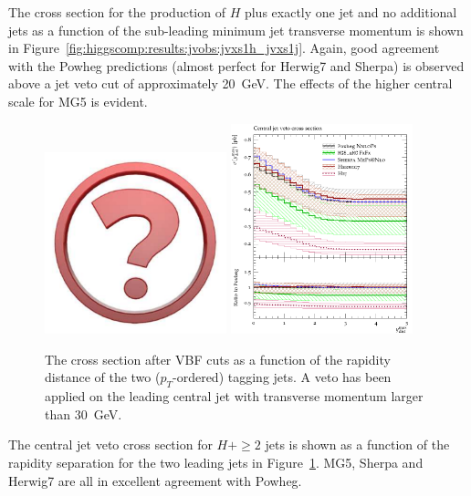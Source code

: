 The cross section for the production of $H$ plus exactly one jet and
no additional jets as a function of the sub-leading minimum jet
transverse momentum is shown in
Figure~\ref{fig:higgscomp:results:jvobs:jvxs1h_jvxs1j}. Again, good
agreement with the Powheg predictions (almost perfect for Herwig7 and
Sherpa) is observed above a jet veto cut of approximately 20~GeV. The
effects of the higher central scale for MG5 is evident.

\begin{figure}[t!]
  \centering
  \includegraphics[width=0.47\textwidth]{Micon.pdf}
  \hfill
  \includegraphics[width=0.47\textwidth]{figures/hjetscomp_xs_central_jet_veto_VBF.pdf}
  \caption{
    The cross section after VBF cuts as a function of the rapidity
    distance of the two ($p_T$-ordered) tagging jets. A veto has been
    applied on the leading central jet with transverse momentum larger
    than 30~GeV.
    \label{fig:higgscomp:results:jvobs:cjvxsvbf}
  }
\end{figure}

The central jet veto cross section for $H+\ge2$ jets is shown as a
function of the rapidity separation for the two leading jets in
Figure~\ref{fig:higgscomp:results:jvobs:cjvxsvbf}. MG5, Sherpa and
Herwig7 are all in excellent agreement with Powheg.
